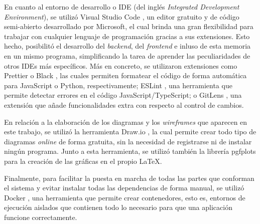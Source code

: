 \bigskip
En cuanto al entorno de desarrollo o IDE (del inglés \textit{Integrated Development Environment}), se utilizó Visual Studio Code \cite{vscode}, un editor gratuito y de código semi-abierto desarrollado por Microsoft, el cual
brinda una gran flexibilidad para trabajar con cualquier lenguaje de programación gracias a sus extensiones. Esto hecho, posibilitó el desarrollo
del \textit{backend}, del \textit{frontend} e inluso de esta memoria en un mismo programa, simplificando la tarea de aprender las peculiaridades de
otros IDEs más específicos. Más en concreto, se utilizaron extensiones como Prettier \cite{prettier} o Black \cite{blackformatter}, las cuales permiten formatear el código de forma automática para JavaScript o Python, respectivamente;
ESLint \cite{eslint}, una herramienta que permite detectar errores en el código JavaScript/TypeScript; o GitLens \cite{gitlens}, una extensión que añade funcionalidades extra con respecto
al control de cambios.

\bigskip
En relación a la elaboración de los diagramas y los \textit{wireframes} que aparecen en este trabajo, se utilizó la herramienta Draw.io \cite{drawio}, la cual permite crear todo tipo de diagramas
\textit{online} de forma gratuita, sin la necesidad de registrarse ni de instalar ningún programa.
Junto a esta herramienta, se utilizó también la librería pgfplots \cite{pgfplots} para la creación de las gráficas en el propio \LaTeX.

\bigskip
Finalmente, para facilitar la puesta en marcha de todas las partes que conforman el sistema y evitar instalar todas las dependencias de forma manual, se utilizó Docker \cite{docker}, 
una herramienta que permite crear contenedores, esto es, entornos de ejecución aislados que contienen todo lo necesario para que una aplicación funcione correctamente.

